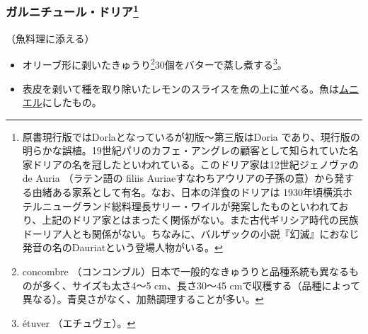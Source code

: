 \begin{recette}
\atoaki{}

\hypertarget{garniture-doria}{%
\subsubsection[ガルニチュール・ドリア]{\texorpdfstring{ガルニチュール・ドリア\footnote{原書現行版ではDorlaとなっているが初版〜第三版はDoria
  であり、現行版の明らかな誤植。19世紀パリのカフェ・アングレの顧客として知られていた名家ドリアの名を冠したといわれている。このドリア家は12世紀ジェノヴァの
  de Auria （ラテン語の filiis
  Auriaeすなわちアウリアの子孫の意）から発する由緒ある家系として有名。なお、日本の洋食のドリアは
  1930年頃横浜ホテルニューグランド総料理長サリー・ワイルが発案したものといわれており、上記のドリア家とはまったく関係がない。また古代ギリシア時代の民族ドーリア人とも関係がない。ちなみに、バルザックの小説『幻滅』におなじ発音の名のDauriatという登場人物がいる。}}{ガルニチュール・ドリア}}\label{garniture-doria}}



（魚料理に添える）

\begin{itemize}
\item
  オリーブ形に剥いたきゅうり\footnote{concombre
    （コンコンブル）日本で一般的なきゅうりと品種系統も異なるものが多く、サイズも太さ4〜5
    cm、長さ30〜45
    cmで収穫する（品種によって異なる）。青臭さがなく、加熱調理することが多い。}30個をバターで蒸し煮する\footnote{étuver
    （エチュヴェ）。}。
\item
  表皮を剥いて種を取り除いたレモンのスライスを魚の上に並べる。魚は\protect\hyperlink{meuniere}{ムニエル}にしたもの。
\end{itemize}

\atoaki{}

\hypertarget{garniture-dubarry}{%
}
\end{recette}
